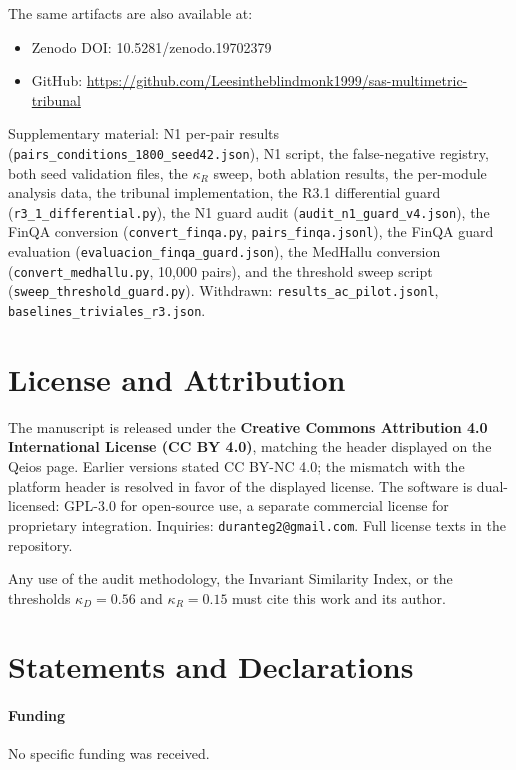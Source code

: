 \documentclass[11pt,a4paper]{article}
\begin{document}
The same artifacts are also available at:
\begin{itemize}
    \item Zenodo DOI: 10.5281/zenodo.19702379
    \item GitHub: \url{https://github.com/Leesintheblindmonk1999/sas-multimetric-tribunal}
\end{itemize}

Supplementary material: N1 per-pair results (\texttt{pairs\_conditions\_1800\_seed42.json}), N1 script, the false-negative registry, both seed validation files, the $\kappa_R$ sweep, both ablation results, the per-module analysis data, the tribunal implementation, the R3.1 differential guard (\texttt{r3\_1\_differential.py}), the N1 guard audit (\texttt{audit\_n1\_guard\_v4.json}), the FinQA conversion (\texttt{convert\_finqa.py}, \texttt{pairs\_finqa.jsonl}), the FinQA guard evaluation (\texttt{evaluacion\_finqa\_guard.json}), the MedHallu conversion (\texttt{convert\_medhallu.py}, 10,000 pairs), and the threshold sweep script (\texttt{sweep\_threshold\_guard.py}). Withdrawn: \texttt{results\_ac\_pilot.jsonl}, \texttt{baselines\_triviales\_r3.json}.

\section*{License and Attribution}
\label{sec:license}

The manuscript is released under the \textbf{Creative Commons Attribution 4.0 International License (CC BY 4.0)}, matching the header displayed on the Qeios page. Earlier versions stated CC BY-NC 4.0; the mismatch with the platform header is resolved in favor of the displayed license. The software is dual-licensed: GPL-3.0 for open-source use, a separate commercial license for proprietary integration. Inquiries: \texttt{duranteg2@gmail.com}. Full license texts in the repository.

Any use of the audit methodology, the Invariant Similarity Index, or the thresholds $\kappa_D = 0.56$ and $\kappa_R = 0.15$ must cite this work and its author.

\section*{Statements and Declarations}
\paragraph{Funding} No specific funding was received.
\end{document}
